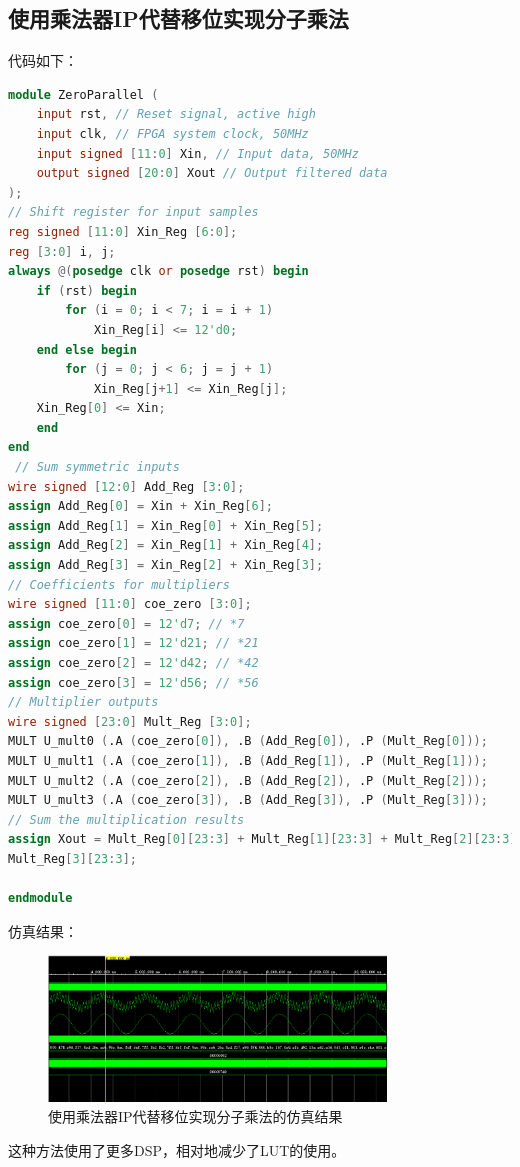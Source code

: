\subsection{使用乘法器IP代替移位实现分子乘法}
代码如下：
\begin{lstlisting}[language=verilog,caption={使用乘法器IP代替移位实现分子乘法}]
module ZeroParallel (
    input rst, // Reset signal, active high
    input clk, // FPGA system clock, 50MHz
    input signed [11:0] Xin, // Input data, 50MHz
    output signed [20:0] Xout // Output filtered data
);
// Shift register for input samples
reg signed [11:0] Xin_Reg [6:0];
reg [3:0] i, j;
always @(posedge clk or posedge rst) begin
    if (rst) begin
        for (i = 0; i < 7; i = i + 1)
            Xin_Reg[i] <= 12'd0;
    end else begin
        for (j = 0; j < 6; j = j + 1)
            Xin_Reg[j+1] <= Xin_Reg[j];
    Xin_Reg[0] <= Xin;
    end
end
 // Sum symmetric inputs
wire signed [12:0] Add_Reg [3:0];
assign Add_Reg[0] = Xin + Xin_Reg[6];
assign Add_Reg[1] = Xin_Reg[0] + Xin_Reg[5];
assign Add_Reg[2] = Xin_Reg[1] + Xin_Reg[4];
assign Add_Reg[3] = Xin_Reg[2] + Xin_Reg[3];
// Coefficients for multipliers
wire signed [11:0] coe_zero [3:0];
assign coe_zero[0] = 12'd7; // *7
assign coe_zero[1] = 12'd21; // *21
assign coe_zero[2] = 12'd42; // *42
assign coe_zero[3] = 12'd56; // *56
// Multiplier outputs
wire signed [23:0] Mult_Reg [3:0]; 
MULT U_mult0 (.A (coe_zero[0]), .B (Add_Reg[0]), .P (Mult_Reg[0]));
MULT U_mult1 (.A (coe_zero[1]), .B (Add_Reg[1]), .P (Mult_Reg[1]));
MULT U_mult2 (.A (coe_zero[2]), .B (Add_Reg[2]), .P (Mult_Reg[2]));
MULT U_mult3 (.A (coe_zero[3]), .B (Add_Reg[3]), .P (Mult_Reg[3]));
// Sum the multiplication results
assign Xout = Mult_Reg[0][23:3] + Mult_Reg[1][23:3] + Mult_Reg[2][23:3] +
Mult_Reg[3][23:3];

endmodule
\end{lstlisting}
仿真结果：
\begin{figure}[htbp]
    \centering
    \includegraphics[width=0.8\textwidth]{figure/exp8/add-on.png}
    \caption{使用乘法器IP代替移位实现分子乘法的仿真结果}
    \label{fig:exp8:mult_ip_sim}
\end{figure}
这种方法使用了更多DSP，相对地减少了LUT的使用。

